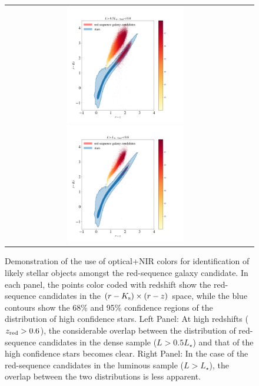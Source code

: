 \documentclass[fleqn,usenatbib,useAMS]{mnras}
\begin{document}
\begin{figure}
\begin{tabular}{cc}
\includegraphics[width=0.5\textwidth]{figures_tmp/red_vs_star_dense.png}
\includegraphics[width=0.5\textwidth]{figures_tmp/red_vs_star_lum.png}
\end{tabular}
\caption{\label{fig:star_galaxy_I} Demonstration of the use of optical+NIR colors for identification of likely stellar objects amongst the red-sequence galaxy candidate. 
In each panel, the points color coded with redshift show the red-sequence candidates in the $(r-K_{\rm s}) \times (r-z)$ space, while the blue contours show the 68\% and 95\% confidence regions of the distribution of high confidence stars. Left Panel: At high redshifts ($z_{\rm red}>0.6$), the considerable overlap between the distribution of red-sequence candidates in the dense sample ($L>0.5L_{\star}$) and that of the high confidence stars becomes clear. Right Panel: In the case of the red-sequence candidates in the luminous sample ($L>L_{\star}$), the overlap between the two distributions is less apparent.} 
\end{figure}
\end{document}
